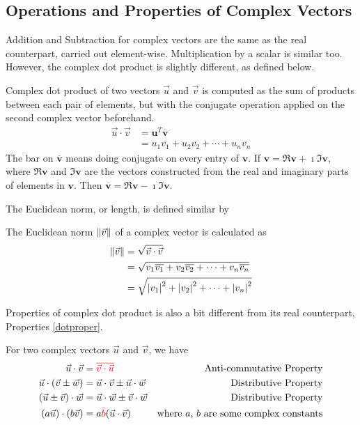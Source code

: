 \subsection{Operations and Properties of Complex Vectors}
Addition and Subtraction for complex vectors are the same as the real counterpart, carried out element-wise. Multiplication by a scalar is similar too. However, the complex dot product is slightly different, as defined below.
\begin{defn}
\label{complexdotproduct}
Complex dot product of two vectors $\vec{u}$ and $\vec{v}$ is computed as the sum of products between each pair of elements, but with the conjugate operation applied on the second complex vector beforehand.
\begin{align*}
\vec{u} \cdot \vec{v} &= \textbf{u}^T \overline{\textbf{v}} \\
&= u_1\overline{v_1} + u_2\overline{v_2} + \cdots + u_n\overline{v_n}
\end{align*}
The bar on $\overline{\textbf{v}}$ means doing conjugate on every entry of $\textbf{v}$. If $\textbf{v} = \Re{\textbf{v}} + \imath \Im{\textbf{v}}$, where $\Re{\textbf{v}}$ and $\Im{\textbf{v}}$ are the vectors constructed from the real and imaginary parts of elements in $\textbf{v}$. Then $\overline{\textbf{v}} = \Re{\textbf{v}} - \imath \Im{\textbf{v}}$.
\end{defn}
The Euclidean norm, or length, is defined similar by
\begin{defn}
The Euclidean norm $\norm{\vec{v}}$ of a complex vector is calculated as
\begin{align*}
\norm{\vec{v}} &= \sqrt{\vec{v} \cdot \vec{v}} \\
&= \sqrt{v_1\overline{v_1} + v_2\overline{v_2} + \cdots + v_n\overline{v_n}} \\
&= \sqrt{\abs{v_1}^2 + \abs{v_2}^2 + \cdots + \abs{v_n}^2}
\end{align*}
\end{defn}
Properties of complex dot product is also a bit different from its real counterpart, Properties \ref{dotproper}.
\begin{proper}
For two complex vectors $\vec{u}$ and $\vec{v}$, we have
\begin{align*}
\vec{u} \cdot \vec{v} &= \textcolor{red}{\overline{\vec{v} \cdot \vec{u}}} &\text{Anti-commutative Property} \\
\vec{u} \cdot (\vec{v} \pm \vec{w}) &= \vec{u} \cdot \vec{v} \pm \vec{u} \cdot \vec{w} &\text{Distributive Property} \\
(\vec{u} \pm \vec{v}) \cdot \vec{w} &= \vec{u} \cdot \vec{w} \pm \vec{v} \cdot \vec{w} &\text{Distributive Property} \\
(a\vec{u}) \cdot (b\vec{v}) &= a\textcolor{red}{\bar{b}}(\vec{u} \cdot \vec{v}) &\text{where $a$, $b$ are some complex constants}    
\end{align*}
\end{proper}
